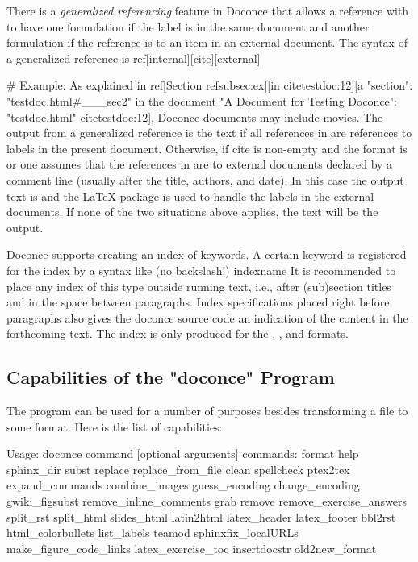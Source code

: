\documentclass[%
oneside,                 %
final,                   %
chapterprefix=true,      %
open=right               %
10pt]{book}
\begin{document}
{There is a \emph{generalized referencing} feature in Doconce that allows
a reference with  to have one formulation if the label is
in the same document and another formulation if the reference is
to an item in an external document. The syntax of a generalized
reference is
\bccq
ref[internal][cite][external]

# Example:
As explained in
ref[Section ref{subsec:ex}][in cite{testdoc:12}][a "section":
"testdoc.html#___sec2" in the document
"A Document for Testing Doconce": "testdoc.html" cite{testdoc:12}],
Doconce documents may include movies.
\eccq
The output from a generalized reference is the text  if all
 references in  are references to labels in the
present document. Otherwise, if cite is non-empty and the format is
 or  one assumes that the references in 
are to external documents declared by a comment line  (usually after the title, authors,
and date). In this case the output text is  and the
{\LaTeX} package  is used to handle the labels in the external
documents.  If none of the two situations above applies, the
 text will be the output.

Doconce supports creating an index of keywords. A certain keyword
is registered for the index by a syntax like (no
backslash!)
\bccq
index{name}
\eccq
It is recommended to place any index of this type outside
running text, i.e., after (sub)section titles and in the space between
paragraphs. Index specifications placed right before paragraphs also
gives the doconce source code an indication of the content in the
forthcoming text. The index is only produced for the , , and
 formats.

\subsection{Capabilities of the "doconce" Program}

The  program can be used for a number of purposes besides
transforming a  file to some format. Here is the
list of capabilities:

\bshpro
Usage: doconce command [optional arguments]
commands: format help sphinx_dir subst replace replace_from_file clean spellcheck ptex2tex expand_commands combine_images guess_encoding change_encoding gwiki_figsubst remove_inline_comments grab remove remove_exercise_answers split_rst split_html slides_html latin2html latex_header latex_footer bbl2rst html_colorbullets list_labels teamod sphinxfix_localURLs make_figure_code_links latex_exercise_toc insertdocstr old2new_format


}
\end{document}
